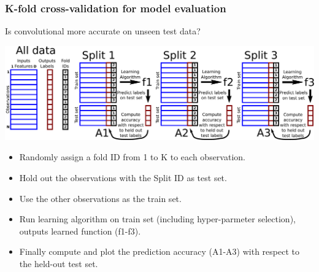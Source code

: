 \documentclass{beamer}
\begin{document}
\begin{frame}
  \frametitle{K-fold cross-validation for model evaluation}
  Is convolutional more accurate on unseen test data?
  
  \includegraphics[width=\textwidth]{drawing-cross-validation}
  
  \begin{itemize}
  \item Randomly assign a fold ID from 1 to K to each observation.
  \item Hold out the observations with the Split ID as test set.
  \item Use the other observations as the train set.
  \item Run learning algorithm on train set (including hyper-parmeter
    selection), outputs learned function (f1-f3).
  \item Finally compute and plot the prediction accuracy (A1-A3) with
    respect to the held-out test set.
  \end{itemize}
\end{frame}
\end{document}
